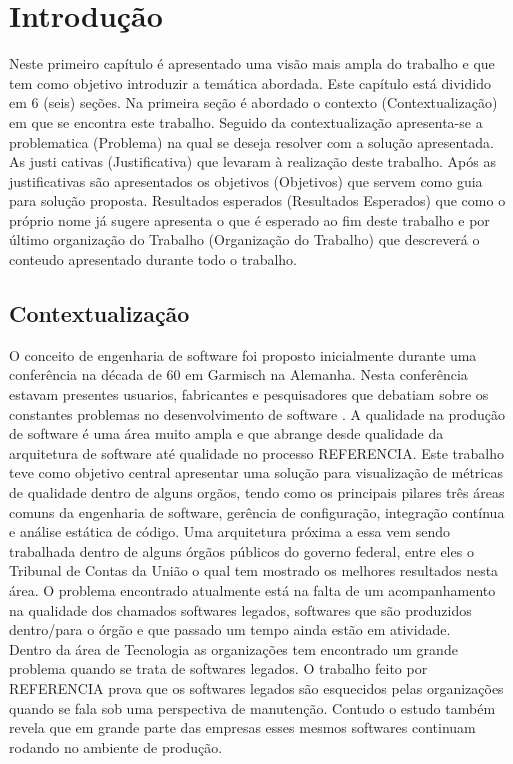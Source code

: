 \chapter[Introdução]{Introdução}
	Neste primeiro capítulo é apresentado uma visão mais ampla do trabalho e que tem como objetivo introduzir a temática abordada. Este capítulo está dividido em 6 (seis) seções. Na primeira seção é abordado o contexto (Contextualização) em que se encontra este trabalho. Seguido da contextualização apresenta-se a problematica (Problema) na qual se deseja resolver com a solução apresentada. As justi cativas (Justificativa) que levaram à realização deste trabalho. Após as justificativas são apresentados os objetivos (Objetivos) que servem como guia para solução proposta. Resultados esperados (Resultados Esperados) que como o próprio nome já sugere apresenta o que é esperado ao  fim deste trabalho e por último organização do Trabalho (Organização do Trabalho) que descreverá o conteudo apresentado durante todo o trabalho.


\section{Contextualização}
	O conceito de engenharia de software foi proposto inicialmente durante uma conferência na década de 60 em Garmisch na Alemanha. Nesta conferência estavam presentes usuarios, fabricantes e pesquisadores que debatiam sobre os constantes problemas no desenvolvimento de software \cite{Paduelli}.
A qualidade na produção de software é uma área muito ampla e que abrange desde qualidade da arquitetura de software até qualidade no processo REFERENCIA. Este trabalho teve como objetivo central apresentar uma solução para visualização de métricas de qualidade dentro de alguns orgãos, tendo como os principais pilares três áreas comuns da engenharia de software, gerência de configuração, integração contínua e análise estática de código. Uma arquitetura próxima a essa vem sendo trabalhada dentro de alguns órgãos públicos do governo federal, entre eles o Tribunal de Contas da União o qual tem mostrado os melhores resultados nesta área. O problema encontrado atualmente está na falta de um acompanhamento na qualidade dos chamados softwares legados, softwares que são produzidos dentro/para o órgão e que passado um tempo ainda estão em atividade.
	\\Dentro da área de Tecnologia as organizações tem encontrado um grande problema quando se trata de softwares legados. O trabalho feito por REFERENCIA prova que os softwares legados são esquecidos pelas organizações quando se fala sob uma perspectiva de manutenção. Contudo o estudo também revela que em grande parte das empresas esses mesmos softwares continuam rodando no ambiente de produção.
	

